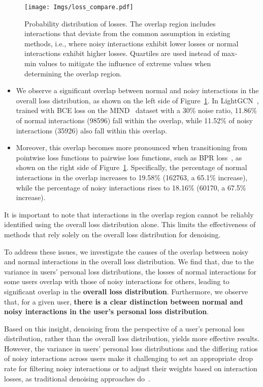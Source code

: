 \begin{figure}
    \centering
    \texttt{[image: Imgs/loss\_compare.pdf]}
    \caption{Probability distribution of losses. The overlap region includes interactions that deviate from the common assumption in existing methods, i.e., where noisy interactions exhibit lower losses or normal interactions exhibit higher losses. Quartiles are used instead of max-min values to mitigate the influence of extreme values when determining the overlap region.}
    \label{fig:intro_loss}
\end{figure}
\begin{itemize}[leftmargin=*]
    \item We observe a significant overlap between normal and noisy interactions in the overall loss distribution, as shown on the left side of Figure~\ref{fig:intro_loss}. In LightGCN~\cite{he2020lightgcn}, trained with BCE loss on the MIND~\cite{wu2020mind} dataset with a 30\% noise ratio, 11.86\% of normal interactions (\num{98596}) fall within the overlap, while 11.52\% of noisy interactions (\num{35926}) also fall within this overlap.
    \item Moreover, this overlap becomes more pronounced when transitioning from pointwise loss functions to pairwise loss functions, such as BPR loss~\cite{rendle2009bpr}, as shown on the right side of Figure~\ref{fig:intro_loss}. Specifically, the percentage of normal interactions in the overlap increases to 19.58\% (\num{162763}, a 65.1\% increase), while the percentage of noisy interactions rises to 18.16\% (\num{60170}, a 67.5\% increase).
\end{itemize}
It is important to note that interactions in the overlap region cannot be reliably identified using the overall loss distribution alone. This limits the effectiveness of methods that rely solely on the overall loss distribution for denoising.

To address these issues, we investigate the causes of the overlap between noisy and normal interactions in the overall loss distribution. We find that, due to the variance in users' personal loss distributions, the losses of normal interactions for some users overlap with those of noisy interactions for others, leading to significant overlap in the \textbf{overall loss distribution}. Furthermore, we observe that, for a given user, \textbf{there is a clear distinction between normal and noisy interactions in the user's personal loss distribution}.

Based on this insight, denoising from the perspective of a user's personal loss distribution, rather than the overall loss distribution, yields more effective results. However, the variance in users' personal loss distributions and the differing ratios of noisy interactions across users make it challenging to set an appropriate drop rate for filtering noisy interactions or to adjust their weights based on interaction losses, as traditional denoising approaches do~\cite{wang2021denoising, he2024double}.

